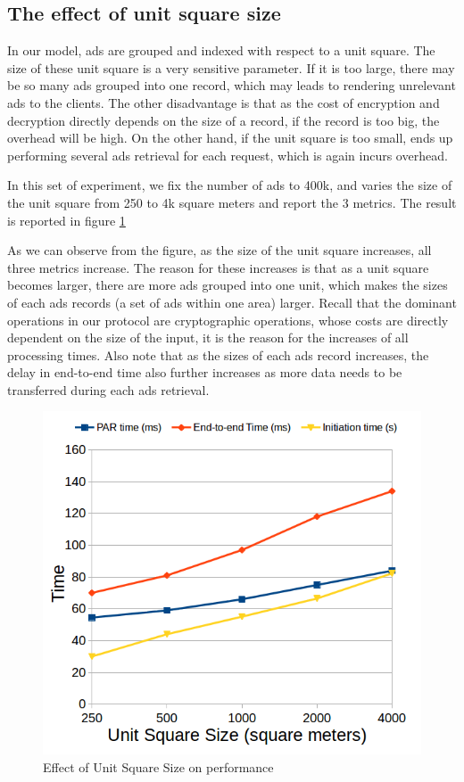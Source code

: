 \subsection{The effect of unit square size}
\label{subsec:square_size}
In our model, ads are grouped and indexed with respect to a unit square. The size of these unit square is a very sensitive parameter. If it is too large, there may be so many ads grouped into one record, which may leads to rendering unrelevant ads to the clients. The other disadvantage is that as the cost of encryption and decryption directly depends on the size of a record, if the record is too big, the overhead will be high. On the other hand, if the unit square is too small, \codename ends up performing several ads retrieval for each request, which is again incurs overhead.

In this set of experiment, we fix the number of ads to 400k, and varies the size of the unit square from 250 to 4k square meters and report the 3 metrics. The result is reported in figure \ref{fig:square}

As we can observe from the figure, as the size of the unit square increases, all three metrics increase. The reason for these increases is that as a unit square becomes larger, there are more ads grouped into one unit, which makes the sizes of each ads records (a set of ads within one area) larger. Recall that the dominant operations in our protocol are cryptographic operations, whose costs are directly dependent on the size of the input, it is the reason for the increases of all processing times.
Also note that as the sizes of each ads record increases, the delay in end-to-end time also further increases as more data needs to be transferred during each ads retrieval.

\begin{figure}[h]
\includegraphics[scale=0.5]{figures/square_size.png}
\caption{Effect of Unit Square Size on \codename performance}
\vspace{-10pt}
\label{fig:square}
\end{figure}



